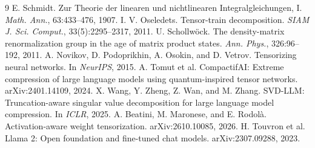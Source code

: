 \documentclass[10pt,twocolumn]{article}
\begin{document}
\begin{thebibliography}{9}\scriptsize
{} E. Schmidt. Zur Theorie der linearen und nichtlinearen Integralgleichungen, I. \emph{Math. Ann.}, 63:433--476, 1907.
 I. V. Oseledets. Tensor-train decomposition. \emph{SIAM J. Sci. Comput.}, 33(5):2295--2317, 2011.
 U. Schollw\"ock. The density-matrix renormalization group in the age of matrix product states. \emph{Ann. Phys.}, 326:96--192, 2011.
 A. Novikov, D. Podoprikhin, A. Osokin, and D. Vetrov. Tensorizing neural networks. In \emph{NeurIPS}, 2015.
 A. Tomut et al. CompactifAI: Extreme compression of large language models using quantum-inspired tensor networks. arXiv:2401.14109, 2024.
 X. Wang, Y. Zheng, Z. Wan, and M. Zhang. SVD-LLM: Truncation-aware singular value decomposition for large language model compression. In \emph{ICLR}, 2025.
 A. Beatini, M. Maronese, and E. Rodol\`a. Activation-aware weight tensorization. arXiv:2610.10085, 2026.
 H. Touvron et al. Llama 2: Open foundation and fine-tuned chat models. arXiv:2307.09288, 2023.
\end{thebibliography}
\end{document}
